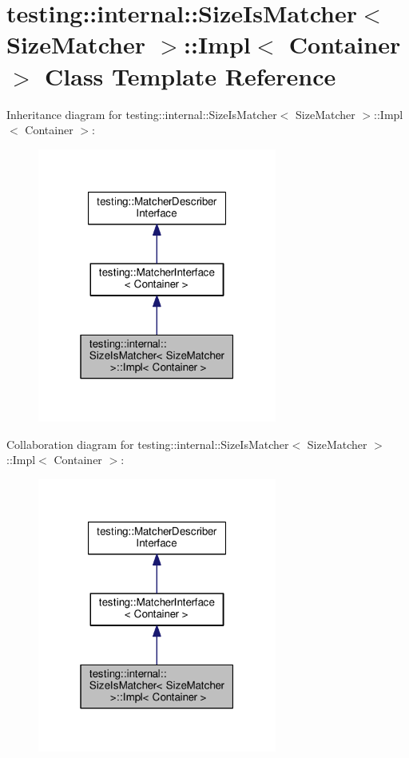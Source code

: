 \hypertarget{classtesting_1_1internal_1_1SizeIsMatcher_1_1Impl}{}\section{testing\+:\+:internal\+:\+:Size\+Is\+Matcher$<$ Size\+Matcher $>$\+:\+:Impl$<$ Container $>$ Class Template Reference}
\label{classtesting_1_1internal_1_1SizeIsMatcher_1_1Impl}


Inheritance diagram for testing\+:\+:internal\+:\+:Size\+Is\+Matcher$<$ Size\+Matcher $>$\+:\+:Impl$<$ Container $>$\+:\nopagebreak
\begin{figure}[H]
\begin{center}
\leavevmode
\includegraphics[width=223pt]{classtesting_1_1internal_1_1SizeIsMatcher_1_1Impl__inherit__graph}
\end{center}
\end{figure}


Collaboration diagram for testing\+:\+:internal\+:\+:Size\+Is\+Matcher$<$ Size\+Matcher $>$\+:\+:Impl$<$ Container $>$\+:\nopagebreak
\begin{figure}[H]
\begin{center}
\leavevmode
\includegraphics[width=223pt]{classtesting_1_1internal_1_1SizeIsMatcher_1_1Impl__coll__graph}
\end{center}
\end{figure}
